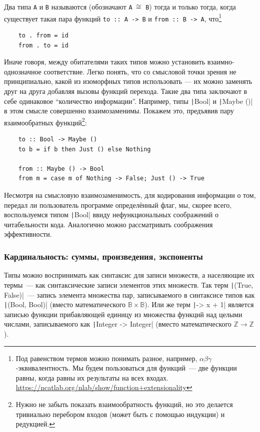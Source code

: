 Два типа \texttt{A} и \texttt{B} называются  (обозначают \texttt{A $\cong$ B}) тогда и только тогда, когда существует такая пара функций \texttt{to :: A -> B} и \texttt{from :: B -> A}, что\footnote{Под равенством термов можно понимать разное, например, $\alpha\beta\gamma$-эквивалентность. Мы будем пользоваться  для функций~--- две функции равны, когда равны их результаты на всех входах. \url{https://ncatlab.org/nlab/show/function+extensionality}}
\begin{verbatim}
    to . from = id
    from . to = id
\end{verbatim}

Иначе говоря, между обитателями таких типов можно установить взаимно-однозначное соответствие.
Легко понять, что со смысловой точки зрения не принципиально, какой из изоморфных типов использовать --- их можно заменять друг на друга добавляя вызовы функций перехода.
Такие два типа заключают в себе одинаковое ``количество информации''.
Например, типы \texttt|Bool| и \texttt|Maybe ()| в этом смысле совершенно взаимозаменимы.
Покажем это, предъявив пару взаимообратных функций\footnote{Нужно не забыть показать взаимообратность функций, но это делается тривиально перебором входов (может быть с помощью индукции) и редукцией.}:
\begin{verbatim}
    to :: Bool -> Maybe ()
    to b = if b then Just () else Nothing

    from :: Maybe () -> Bool
    from m = case m of Nothing -> False; Just () -> True
\end{verbatim}

Несмотря на смысловую взаимозаменимость, для кодирования информации о том, передал ли пользователь программе определённый флаг, мы, скорее всего, воспользуемся типом \texttt|Bool| ввиду нефункциональных соображений о читабельности кода.
Аналогично можно рассматривать соображения эффективности.

\subsubsection{Кардинальность: суммы, произведения, экспоненты} \label{subsubsec:cardinality}

Типы можно воспринимать как синтаксис для записи множеств, а населяющие их термы~--- как синтаксические записи элементов этих множеств.
Так терм \texttt|(True, False)|~--- запись элемента множества пар, записываемого в синтаксисе типов как \texttt|(Bool, Bool)| (вместо математического $\mathbb{B}\times\mathbb{B}$).
Или же терм \texttt|\x -> x + 1| является записью функции прибавляющей единицу из множества функций над целыми числами, записываемого как \texttt|Integer -> Integer| (вместо математического $\mathbb{Z}\to\mathbb{Z}$).

